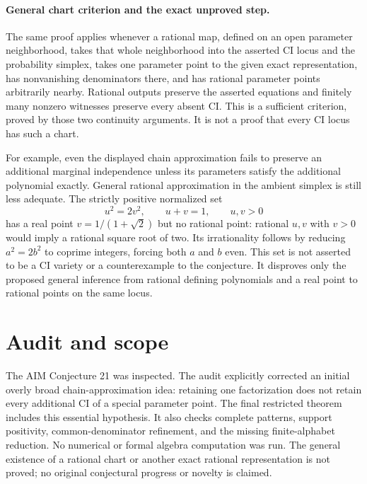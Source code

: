 \documentclass[11pt]{article}
\begin{document}
\paragraph{General chart criterion and the exact unproved step.}
The same proof applies whenever a rational map, defined on an open
parameter neighborhood, takes that whole neighborhood into the asserted
CI locus and the probability simplex, takes one parameter point to the
given exact representation, has nonvanishing denominators there, and
has rational parameter points arbitrarily nearby. Rational outputs
preserve the asserted equations and finitely many nonzero witnesses
preserve every absent CI. This is a sufficient criterion, proved by
those two continuity arguments. It is not a proof that every CI locus
has such a chart.

For example, even the displayed chain approximation fails to preserve
an additional marginal independence unless its parameters satisfy the
additional polynomial exactly. General rational approximation in the
ambient simplex is still less adequate. The strictly positive normalized
set
\[
u^2=2v^2,\qquad u+v=1,\qquad u,v>0
\]
has a real point $v=1/(1+\sqrt2)$ but no rational point: rational
$u,v$ with $v>0$ would imply a rational square root of two. Its
irrationality follows by reducing $a^2=2b^2$ to coprime integers,
forcing both $a$ and $b$ even. This set is not asserted to be a CI
variety or a counterexample to the conjecture. It disproves only the
proposed general inference from rational defining polynomials and a real
point to rational points on the same locus.

\section{Audit and scope}
The AIM Conjecture 21 was inspected. The audit explicitly corrected an
initial overly broad chain-approximation idea: retaining one factorization
does not retain every additional CI of a special parameter point.
The final restricted theorem includes this essential hypothesis. It
also checks complete patterns, support positivity, common-denominator
refinement, and the missing finite-alphabet reduction. No numerical or
formal algebra computation was run. The general existence of a
rational chart or another exact rational representation is not proved;
no original conjectural progress or novelty is claimed.
\end{document}
